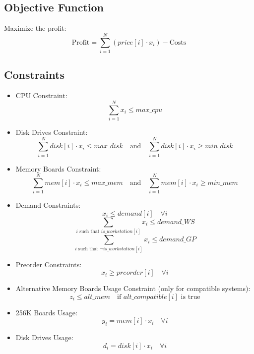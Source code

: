\documentclass{article}
\begin{document}
\subsection*{Objective Function}
Maximize the profit:
\[
\text{Profit} = \sum_{i=1}^{N} (price[i] \cdot x_i) - \text{Costs}
\]

\subsection*{Constraints}
\begin{itemize}
    \item CPU Constraint:
    \[
    \sum_{i=1}^{N} x_i \leq max\_cpu
    \]

    \item Disk Drives Constraint:
    \[
    \sum_{i=1}^{N} disk[i] \cdot x_i \leq max\_disk \quad \text{and} \quad \sum_{i=1}^{N} disk[i] \cdot x_i \geq min\_disk
    \]

    \item Memory Boards Constraint:
    \[
    \sum_{i=1}^{N} mem[i] \cdot x_i \leq max\_mem \quad \text{and} \quad \sum_{i=1}^{N} mem[i] \cdot x_i \geq min\_mem
    \]

    \item Demand Constraints:
    \[
    x_i \leq demand[i] \quad \forall i
    \]
    \[
    \sum_{i \text{ such that } is\_workstation[i]} x_i \leq demand\_WS
    \]
    \[
    \sum_{i \text{ such that } \neg is\_workstation[i]} x_i \leq demand\_GP
    \]

    \item Preorder Constraints:
    \[
    x_i \geq preorder[i] \quad \forall i
    \]

    \item Alternative Memory Boards Usage Constraint (only for compatible systems):
    \[
    z_i \leq alt\_mem \quad \text{if } alt\_compatible[i] \text{ is true}
    \]

    \item 256K Boards Usage:
    \[
    y_i = mem[i] \cdot x_i \quad \forall i
    \]

    \item Disk Drives Usage:
    \[
    d_i = disk[i] \cdot x_i \quad \forall i
    \]

\end{itemize}
\end{document}
